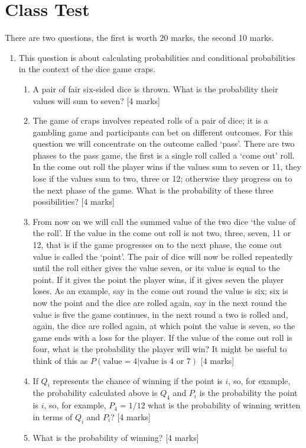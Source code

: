 \documentclass[11pt,a4paper]{scrartcl}
\begin{document}
\section*{Class Test}

There are two questions, the first is worth 20 marks, the second 10 marks.

\begin{enumerate}

\item This question is about calculating probabilities and conditional probabilities in the context of the dice game craps.

\begin{enumerate}
  \item A pair of fair six-sided dice is thrown. What is the probability their values will sum to seven? [4 marks]
  \item The game of craps involves repeated rolls of a pair of dice; it is a gambling game and participants can bet on different outcomes. For this question we will concentrate on the outcome called \lq{}pass\rq{}. There are two phases to the pass game, the first is a single roll called a \lq{}come out\rq{} roll. In the come out roll the player wins if the values sum to seven or 11, they lose if the values sum to two, three or 12; otherwise they progress on to the next phase of the game. What is the probability of these three possibilities?  [4 marks]
  \item From now on we will call the summed value of the two dice \lq{}the value of the roll\rq{}. If the value in the come out roll is not two, three, seven, 11 or 12, that is if the game progresses on to the next phase, the come out value is called the \lq{}point\rq{}. The pair of dice will now be  rolled repeatedly until the roll either gives the value seven, or its value is equal to the point. If it gives the point the player wins, if it gives seven the player loses. As an example, say in the come out round the value is six; six is now the point and the dice are rolled again, say in the next round the value is five the game continues, in the next round a two is rolled and, again, the dice are rolled again, at which point the value is seven, so the game ends with a loss for the player. If the value of the come out roll is four, what is the probability the player will win? It might be useful to think of this as $P(\mbox{value}=4|\mbox{value is 4 or 7})$ [4 marks]
  \item If  $Q_i$ represents the chance of winning if the point is $i$, so, for example, the probability calculated above is $Q_4$ and $P_i$ is the probability the point is $i$, so, for example, $P_4=1/12$
what is the probability of winning written in terms of $Q_i$ and $P_i$? [4 marks]
\item What is the probability of winning? [4 marks]


\end{enumerate}
\end{enumerate}
\end{document}
